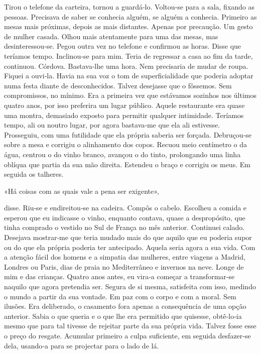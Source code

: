 Tirou o telefone da carteira, tornou a guardá­‑lo. Voltou­‑se para a
sala, fixando as pessoas. Precisava de saber se conhecia alguém, se
alguém a conhecia. Primeiro as mesas mais próximas, depois as mais
distantes. Apenas por precaução. Um gesto de mulher casada. Olhou mais
atentamente para uma das mesas, mas desinteressou­‑se. Pegou outra vez
no telefone e confirmou as horas. Disse que teríamos tempo. Inclinou­‑se
para mim. Teria de regressar a casa ao fim da tarde, continuou. Córdova.
Bastava­‑lhe uma hora. Nem precisaria de mudar de roupa. Fiquei a
ouvi­‑la. Havia na sua voz o tom de superficialidade que poderia adoptar
numa festa diante de desconhecidos. Talvez desejasse que o fôssemos. Sem
compromissos, no mínimo. Era a primeira vez que estávamos sozinhos nos
últimos quatro anos, por isso preferira um lugar público. Aquele
restaurante era quase uma montra, demasiado exposto para permitir
qualquer intimidade. Teríamos tempo, ali ou noutro lugar, por agora
bastava­‑me que ela ali estivesse. Prosseguiu, com uma futilidade que
ela própria saberia ser forçada. Debruçou­‑se sobre a mesa e corrigiu o
alinhamento dos copos. Recuou meio centímetro o da água, centrou o do
vinho branco, avançou o do tinto, prolongando uma linha oblíqua que
partia da sua mão direita. Estendeu o braço e corrigiu os meus. Em
seguida os talheres.

«Há coisas com as quais vale a pena ser exigente»,

disse. Riu­‑se e endireitou­‑se na cadeira. Compôs o cabelo. Escolheu a
comida e esperou que eu indicasse o vinho, enquanto contava, quase a
despropósito, que tinha comprado o vestido no Sul de França no mês
anterior. Continuei calado. Desejava mostrar­‑me que teria mudado mais
do que aquilo que eu poderia supor ou do que ela própria poderia ter
antecipado. Aquela seria agora a sua vida. Com a atenção fácil dos
homens e a simpatia das mulheres, entre viagens a Madrid, Londres ou
Paris, dias de praia no Mediterrâneo e invernos na neve. Longe de mim e
das crianças. Quatro anos antes, eu vira­‑a começar a transformar­‑se
naquilo que agora pretendia ser. Segura de si mesma, satisfeita com
isso, medindo o mundo a partir da sua vontade. Em paz com o corpo e com
a moral. Sem ilusões. Era deliberado, o casamento fora apenas a
consequência de uma opção anterior. Sabia o que queria e o que lhe era
permitido que quisesse, obtê­‑lo­‑ia mesmo que para tal tivesse de
rejeitar parte da sua própria vida. Talvez fosse esse o preço do
resgate. Acumular primeiro a culpa suficiente, em seguida desfazer­‑se
dela, usando­‑a para se projectar para o lado de lá.

